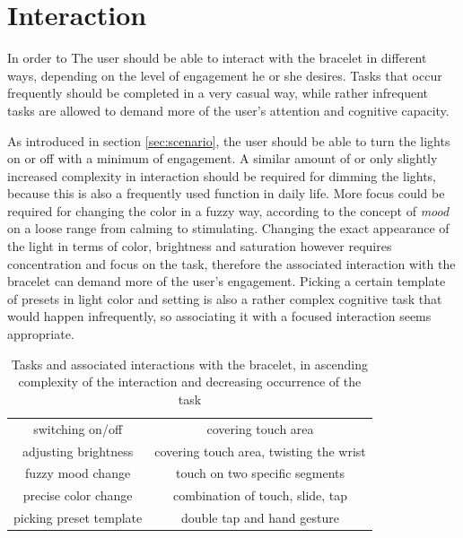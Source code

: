 \chapter{Interaction} %
In order to The user should be able to interact with the bracelet in different ways, depending on the level of engagement he or she desires. Tasks that occur frequently should be completed in a very casual way, while rather infrequent tasks are allowed to demand more of the user's attention and cognitive capacity.

As introduced in section \ref{sec:scenario}, the user should be able to turn the lights on or off with a minimum of engagement. A similar amount of or only slightly increased complexity in interaction should be required for dimming the lights, because this is also a frequently used function in daily life. More focus could be required for changing the color in a fuzzy way, according to the concept of \textit{mood} on a loose range from calming to stimulating. Changing the exact appearance of the light in terms of color, brightness and saturation however requires concentration and focus on the task, therefore the associated interaction with the bracelet can demand more of the user's engagement. Picking a certain template of presets in light color and setting is also a rather complex cognitive task that would happen infrequently, so associating it with a focused interaction seems appropriate.

\begin{table}
	\myfloatalign
	\begin{tabularx}{.95\textwidth}{cc}
		\toprule
		\tableheadline{Task} & \tableheadline{Associated Interaction}\\ 
		\midrule
		switching on/off & covering touch area\\
		adjusting brightness & covering touch area, twisting the wrist\\
		fuzzy mood change & touch on two specific segments\\
		precise color change & combination of touch, slide, tap\\
		picking preset template & double tap and hand gesture\\
		\bottomrule
	\end{tabularx}
	\caption[Tasks and associated interactions with the bracelet]{Tasks and associated interactions with the bracelet, in ascending complexity of the interaction and decreasing occurrence of the task}  \label{tab:interaction}
\end{table}


